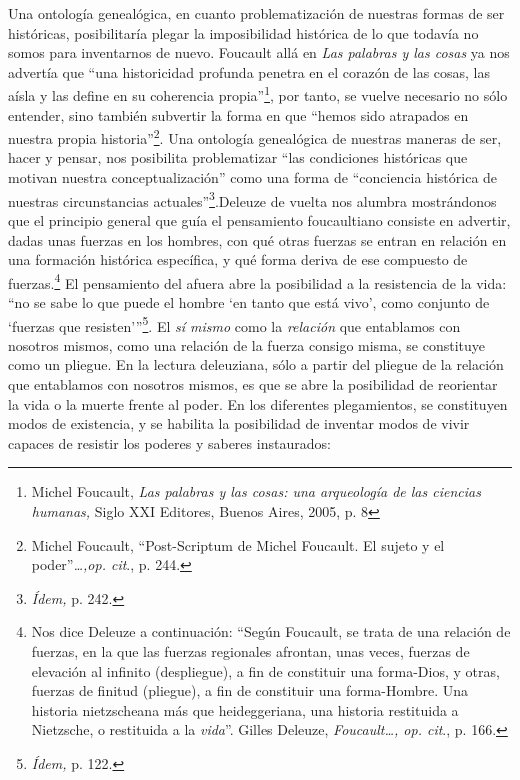 Una ontología genealógica, en cuanto problematización de nuestras formas de ser históricas, posibilitaría plegar la imposibilidad histórica de lo que todavía no somos para inventarnos de nuevo. Foucault allá en \emph{Las palabras y las cosas} ya nos advertía que \enquote{una historicidad profunda penetra en el corazón de las cosas, las aísla y las define en su coherencia propia}\footnote{Michel Foucault, \emph{Las palabras y las cosas: una arqueología de las ciencias humanas,} Siglo XXI Editores, Buenos Aires, 2005, p. 8}, por tanto, se vuelve necesario no sólo entender, sino también subvertir la forma en que \enquote{hemos sido atrapados en nuestra propia historia}\footnote{Michel Foucault, \enquote{Post-Scriptum de Michel Foucault. El sujeto y el poder}\emph{\ldots,op. cit}., p. 244.}. Una ontología genealógica de nuestras maneras de ser, hacer y pensar, nos posibilita problematizar \enquote{las condiciones históricas que motivan nuestra conceptualización} como una forma de \enquote{conciencia histórica de nuestras circunstancias actuales}\footnote{\emph{Ídem,} p. 242.}.Deleuze de vuelta nos alumbra mostrándonos que el principio general que guía el pensamiento foucaultiano consiste en advertir, dadas unas fuerzas en los hombres, con qué otras fuerzas se entran en relación en una formación histórica específica, y qué forma deriva de ese compuesto de fuerzas.\footnote{Nos dice Deleuze a continuación: \enquote{Según Foucault, se trata de una relación de fuerzas, en la que las fuerzas regionales afrontan, unas veces, fuerzas de elevación al infinito (despliegue), a fin de constituir una forma-Dios, y otras, fuerzas de finitud (pliegue), a fin de constituir una forma-Hombre. Una historia nietzscheana más que heideggeriana, una historia restituida a Nietzsche, o restituida a la \emph{vida}}. Gilles Deleuze, \emph{Foucault\ldots, op. cit}., p. 166.} El pensamiento del afuera abre la posibilidad a la resistencia de la vida: \enquote{no se sabe lo que puede el hombre \enquote{en tanto que está vivo}, como conjunto de \enquote{fuerzas que resisten}}\footnote{\emph{Ídem,} p. 122.}. El \emph{sí mismo} como la \emph{relación} que entablamos con nosotros mismos, como una relación de la fuerza consigo misma, se constituye como un pliegue. En la lectura deleuziana, sólo a partir del pliegue de la relación que entablamos con nosotros mismos, es que se abre la posibilidad de reorientar la vida o la muerte frente al poder. En los diferentes plegamientos, se constituyen modos de existencia, y se habilita la posibilidad de inventar modos de vivir capaces de resistir los poderes y saberes instaurados:

